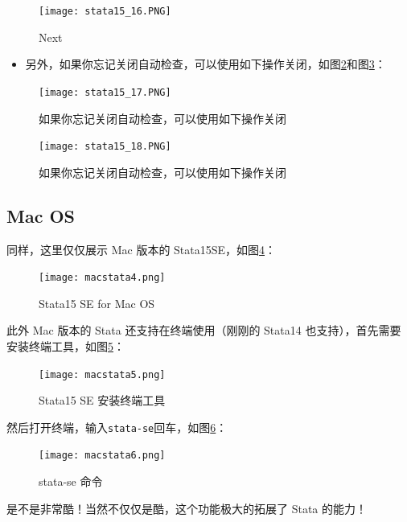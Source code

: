 \documentclass[cn,fancy,blue,11pt]{elegantbook}
\begin{document}
\begin{figure}[htbp]
  \centering
  \texttt{[image: stata15\_16.PNG]}
  \caption{Next}
  \label{fig:stata15_16}
\end{figure}

\begin{itemize}
  \item 另外，如果你忘记关闭自动检查，可以使用如下操作关闭，如图\ref{fig:stata15_17}和图\ref{fig:stata15_18}：
\end{itemize}

\begin{figure}[htbp]
  \centering
  \texttt{[image: stata15\_17.PNG]}
  \caption{如果你忘记关闭自动检查，可以使用如下操作关闭}
  \label{fig:stata15_17}
\end{figure}

\begin{figure}[htbp]
  \centering
  \texttt{[image: stata15\_18.PNG]}
  \caption{如果你忘记关闭自动检查，可以使用如下操作关闭}
  \label{fig:stata15_18}
\end{figure}

\hypertarget{mac-os-1}{%
\subsection{Mac OS}\label{mac-os-1}}

同样，这里仅仅展示 Mac 版本的 Stata15SE，如图\ref{fig:macstata4}：

\begin{figure}[htbp]
  \centering
  \texttt{[image: macstata4.png]}
  \caption{Stata15 SE for Mac OS}
  \label{fig:macstata4}
\end{figure}

此外 Mac 版本的 Stata 还支持在终端使用（刚刚的 Stata14 也支持），首先需要安装终端工具，如图\ref{fig:macstata5}：

\begin{figure}[htbp]
  \centering
  \texttt{[image: macstata5.png]}
  \caption{Stata15 SE 安装终端工具}
  \label{fig:macstata5}
\end{figure}

然后打开终端，输入\lstinline{stata-se}回车，如图\ref{fig:macstata6}：

\begin{figure}[htbp]
  \centering
  \texttt{[image: macstata6.png]}
  \caption{stata-se 命令}
  \label{fig:macstata6}
\end{figure}

是不是非常酷！当然不仅仅是酷，这个功能极大的拓展了 Stata 的能力！
\end{document}
